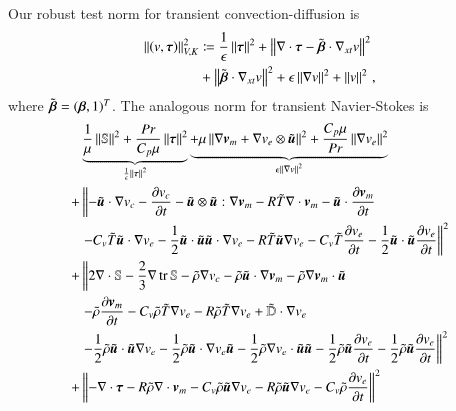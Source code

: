 \documentclass[preprint,12pt]{elsarticle}
\begin{document}
Our robust test norm for transient convection-diffusion is 
\begin{align}
\left\| \left( v,\boldsymbol\tau \right) \right\|_{V,K}^2 &\coloneqq
\frac{1}{\epsilon}\left\| \boldsymbol\tau \right\|^2
+ \left\| \nabla\cdot \boldsymbol\tau - \tilde{\boldsymbol\beta}\cdot\nabla_{xt} v \right\|^2 \nonumber\\
&+\left\| \tilde{\boldsymbol\beta}\cdot \nabla_{xt} v \right\|^2
+ \epsilon\left\| \nabla v \right\|^2
+ \left\| v \right\|^2\,,
\end{align}
where $\tilde{\boldsymbol\beta}=(\boldsymbol\beta,1)^T$.
The analogous norm for transient Navier-Stokes is 
\begin{equation}
\begin{aligned}
&
\underbrace{
\frac{1}{\mu}\norm{\mathbb{S}}^2
+\frac{Pr}{C_p\mu}\norm{\bftau}^2
}_{\frac{1}{\epsilon}\norm{\bftau}^2}
%
\underbrace{
+\mu\norm{\Grad\bfv_m+\Grad v_e\otimes\tilde\bfu}^2
+\frac{C_p\mu}{Pr}\norm{\Grad v_e}^2
}_{\epsilon\norm{\Grad v}^2}\\
%
+&\left\|
-\tilde\bfu\cdot\Grad v_c-\frac{\partial v_c}{\partial t}-\tilde\bfu\otimes\tilde\bfu:\Grad\bfv_m
-R\tilde T\Div\bfv_m-\tilde\bfu\cdot\frac{\partial\bfv_m}{\partial t}\right.\\
&\left.-C_v\tilde T\tilde\bfu\cdot\Grad v_e-\frac{1}{2}\tilde\bfu\cdot\tilde\bfu\tilde\bfu\cdot\Grad v_e
-R\tilde T\tilde\bfu\Grad v_e
-C_v\tilde T\frac{\partial v_e}{\partial t}-\frac{1}{2}\tilde\bfu\cdot\tilde\bfu\frac{\partial v_e}{\partial t}
\right\|^2\\
+&\left\|2\Div\mathbb{S}-\frac{2}{3}\Grad\trace{\mathbb{S}}
-\tilde\rho\Grad v_c
-\tilde\rho\tilde\bfu\cdot\Grad\bfv_m-\tilde\rho\Grad\bfv_m\cdot\tilde\bfu
\right.\\
&\left.
-\tilde\rho\frac{\partial\bfv_m}{\partial t}
-C_v\tilde\rho\tilde T\Grad v_e
-R\tilde\rho\tilde T\Grad v_e
+\tilde{\mathbb{D}}\cdot\Grad v_e
\right.\\
&\left.
-\frac{1}{2}\tilde\rho\tilde\bfu\cdot\tilde\bfu\Grad v_e
-\frac{1}{2}\tilde\rho\tilde\bfu\cdot\Grad v_e\tilde\bfu
-\frac{1}{2}\tilde\rho\Grad v_e\cdot\tilde\bfu\tilde\bfu
-\frac{1}{2}\tilde\rho\tilde\bfu\frac{\partial v_e}{\partial t}
-\frac{1}{2}\tilde\rho\tilde\bfu\frac{\partial v_e}{\partial t}
\right\|^2\\
+&\left\|-\Div\bftau
-R\tilde\rho\Div\bfv_m
-C_v\tilde\rho\tilde\bfu\Grad v_e
-R\tilde\rho\tilde\bfu\Grad v_e
-C_v\tilde\rho\frac{\partial v_e}{\partial t}
\right\|^2\\
%

\end{aligned}
\end{equation}
\end{document}
